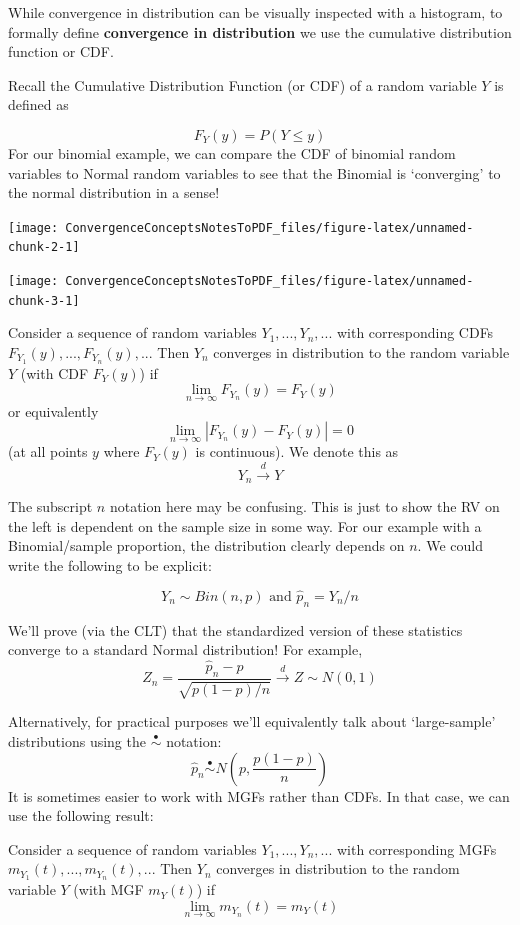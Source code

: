 \documentclass[
]{article}
\providecommand{\tightlist}{%
  \setlength{\itemsep}{0pt}\setlength{\parskip}{0pt}}
\begin{document}
While convergence in distribution can be visually inspected with a
histogram, to formally define \textbf{convergence in distribution} we
use the cumulative distribution function or CDF.

Recall the Cumulative Distribution Function (or CDF) of a random
variable \(Y\) is defined as

\[F_Y(y) = P(Y\leq y)\] For our binomial example, we can compare the CDF
of binomial random variables to Normal random variables to see that the
Binomial is `converging' to the normal distribution in a sense!

\texttt{[image: ConvergenceConceptsNotesToPDF\_files/figure-latex/unnamed-chunk-2-1]}

\texttt{[image: ConvergenceConceptsNotesToPDF\_files/figure-latex/unnamed-chunk-3-1]}

\begin{description}
\tightlist
\item[Convergence in Distribution]
Consider a sequence of random variables \(Y_1,...,Y_n,...\) with
corresponding CDFs \(F_{Y_1}(y), ..., F_{Y_n}(y),..\). Then \(Y_n\)
converges in distribution to the random variable \(Y\) (with CDF
\(F_Y(y)\)) if \[\lim_{n \rightarrow \infty} F_{Y_n}(y)=F_{Y}(y)\] or
equivalently \[\lim_{n \rightarrow \infty} |F_{Y_n}(y)-F_{Y}(y)|=0\] (at
all points \(y\) where \(F_Y(y)\) is continuous). We denote this as
\[Y_n\stackrel{d}\rightarrow Y\]
\end{description}

The subscript \(n\) notation here may be confusing. This is just to show
the RV on the left is dependent on the sample size in some way. For our
example with a Binomial/sample proportion, the distribution clearly
depends on \(n\). We could write the following to be explicit:

\[Y_n \sim Bin(n, p)\mbox{   and   } \hat{p}_n = Y_n/n\]

We'll prove (via the CLT) that the standardized version of these
statistics converge to a standard Normal distribution! For example,
\[Z_n = \frac{\hat{p}_n-p}{\sqrt{p(1-p)/n}} \stackrel{d}{\rightarrow}Z\sim N(0,1)\]

Alternatively, for practical purposes we'll equivalently talk about
`large-sample' distributions using the \(\stackrel{\bullet}{\sim}\)
notation:
\[\hat{p}_n\stackrel{\bullet}{\sim}N\left(p, \frac{p(1-p)}{n}\right)\]
It is sometimes easier to work with MGFs rather than CDFs. In that case,
we can use the following result:

\begin{description}
\tightlist
\item[Convergence of MGFs]
Consider a sequence of random variables \(Y_1,...,Y_n,...\) with
corresponding MGFs \(m_{Y_1}(t), ..., m_{Y_n}(t),..\). Then \(Y_n\)
converges in distribution to the random variable \(Y\) (with MGF
\(m_Y(t)\)) if \[\lim_{n \rightarrow \infty} m_{Y_n}(t) = m_Y(t)\]
\end{description}
\end{document}
